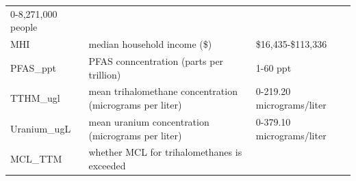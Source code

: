 \documentclass[12pt,]{article}
\begin{document}
\begin{longtable}[]{@{}lll@{}}
\begin{minipage}[t]{0.23\columnwidth}
0-8,271,000 people\strut
\end{minipage}\tabularnewline
\begin{minipage}[t]{0.22\columnwidth}\raggedright
MHI\strut
\end{minipage} & \begin{minipage}[t]{0.46\columnwidth}\raggedright
median household income (\$)\strut
\end{minipage} & \begin{minipage}[t]{0.23\columnwidth}\raggedright
\$16,435-\$113,336\strut
\end{minipage}\tabularnewline
\begin{minipage}[t]{0.22\columnwidth}\raggedright
PFAS\_ppt\strut
\end{minipage} & \begin{minipage}[t]{0.46\columnwidth}\raggedright
PFAS conncentration (parts per trillion)\strut
\end{minipage} & \begin{minipage}[t]{0.23\columnwidth}\raggedright
1-60 ppt\strut
\end{minipage}\tabularnewline
\begin{minipage}[t]{0.22\columnwidth}\raggedright
TTHM\_ugl\strut
\end{minipage} & \begin{minipage}[t]{0.46\columnwidth}\raggedright
mean trihalomethane concentration (micrograms per liter)\strut
\end{minipage} & \begin{minipage}[t]{0.23\columnwidth}\raggedright
0-219.20 micrograms/liter\strut
\end{minipage}\tabularnewline
\begin{minipage}[t]{0.22\columnwidth}\raggedright
Uranium\_ugL\strut
\end{minipage} & \begin{minipage}[t]{0.46\columnwidth}\raggedright
mean uranium concentration (micrograms per liter)\strut
\end{minipage} & \begin{minipage}[t]{0.23\columnwidth}\raggedright
0-379.10 micrograms/liter\strut
\end{minipage}\tabularnewline
\begin{minipage}[t]{0.22\columnwidth}\raggedright
MCL\_TTM\strut
\end{minipage} & \begin{minipage}[t]{0.46\columnwidth}\raggedright
whether MCL for trihalomethanes is exceeded\strut
\end{minipage} & \begin{minipage}[t]{0.23\columnwidth}\raggedright

\end{minipage}
\end{longtable}
\end{document}
